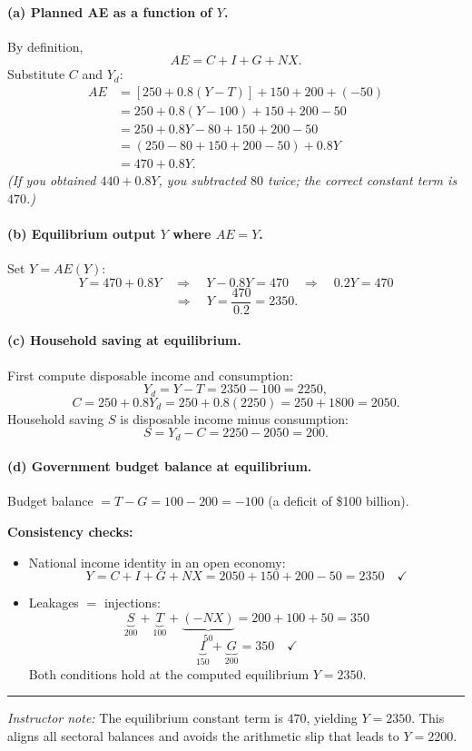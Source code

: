 \documentclass[12pt]{article}
\begin{document}
\paragraph{(a) Planned AE as a function of $Y$.}
By definition,
\[
AE = C + I + G + NX.
\]
Substitute $C$ and $Y_d$:
\[
\begin{aligned}
AE &= \left[250 + 0.8(Y - T)\right] + 150 + 200 + (-50)\\
   &= 250 + 0.8(Y-100) + 150 + 200 - 50 \\
   &= 250 + 0.8Y - 80 + 150 + 200 - 50 \\
   &= (250-80+150+200-50) + 0.8Y \\
   &= 470 + 0.8Y.
\end{aligned}
\]
\textit{(If you obtained $440+0.8Y$, you subtracted $80$ twice; the correct constant term is $470$.)}

\paragraph{(b) Equilibrium output $Y$ where $AE=Y$.}
Set $Y=AE(Y)$:
\[
Y = 470 + 0.8Y \quad \Rightarrow \quad Y - 0.8Y = 470 \quad \Rightarrow \quad 0.2Y=470
\]
\[
\Rightarrow \quad Y = \frac{470}{0.2} = 2350.
\]

\paragraph{(c) Household saving at equilibrium.}
First compute disposable income and consumption:
\[
Y_d = Y - T = 2350 - 100 = 2250,
\]
\[
C = 250 + 0.8Y_d = 250 + 0.8(2250) = 250 + 1800 = 2050.
\]
Household saving $S$ is disposable income minus consumption:
\[
S = Y_d - C = 2250 - 2050 = 200.
\]

\paragraph{(d) Government budget balance at equilibrium.}
Budget balance $= T - G = 100 - 200 = -100$ (a deficit of \$100 billion).
\medskip

\noindent\textbf{Consistency checks:}
\begin{itemize}
    \item National income identity in an open economy:
    \[
    Y = C + I + G + NX = 2050 + 150 + 200 - 50 = 2350 \quad \checkmark
    \]
    \item Leakages $=$ injections:
    \[
    \underbrace{S}_{200} + \underbrace{T}_{100} + \underbrace{(-NX)}_{50} 
    = 200 + 100 + 50 = 350
    \]
    \[
    \underbrace{I}_{150} + \underbrace{G}_{200} = 350 \quad \checkmark
    \]
    Both conditions hold at the computed equilibrium $Y=2350$.
\end{itemize}

\hrule
\vspace{6pt}
\noindent\textit{Instructor note:} The equilibrium constant term is $470$, yielding $Y=2350$. This aligns all sectoral balances and avoids the arithmetic slip that leads to $Y=2200$.
\end{document}
